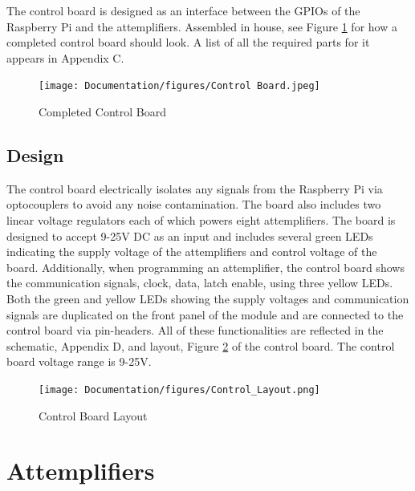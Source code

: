 \documentclass[12pt,a4paper,oneside]{article}
\begin{document}
The control board is designed as an interface between the GPIOs of the Raspberry Pi and the attemplifiers. Assembled in house, see Figure \ref{fig:Control Board} for how a completed control board should look. A list of all the required parts for it appears in Appendix C. 

%
\begin{figure}[H]
\centering
\texttt{[image: Documentation/figures/Control Board.jpeg]}
\caption{Completed Control Board}
\label{fig:Control Board}
\end{figure}
%

\subsection{Design}
\label{sec:3.1}

The control board electrically isolates any signals from the Raspberry Pi via optocouplers to avoid any noise contamination. The board also includes two linear voltage regulators each of which powers eight attemplifiers. The board is designed to accept 9-25V DC as an input and includes several green LEDs indicating the supply voltage of the attemplifiers and control voltage of the board. Additionally, when programming an attemplifier, the control board shows the communication signals, clock, data, latch enable, using three yellow LEDs. Both the green and yellow LEDs showing the supply voltages and communication signals are duplicated on the front panel of the module and are connected to the control board via pin-headers. All of these functionalities are reflected in the schematic, Appendix D, and layout, Figure \ref{fig:Control_Layout} of the control board. The control board voltage range is 9-25V.

%
\begin{figure}[H]
\centering
\texttt{[image: Documentation/figures/Control\_Layout.png]}
\caption{Control Board Layout}
\label{fig:Control_Layout}
\end{figure}
%


\section{Attemplifiers}
\label{sec:4}
\end{document}
